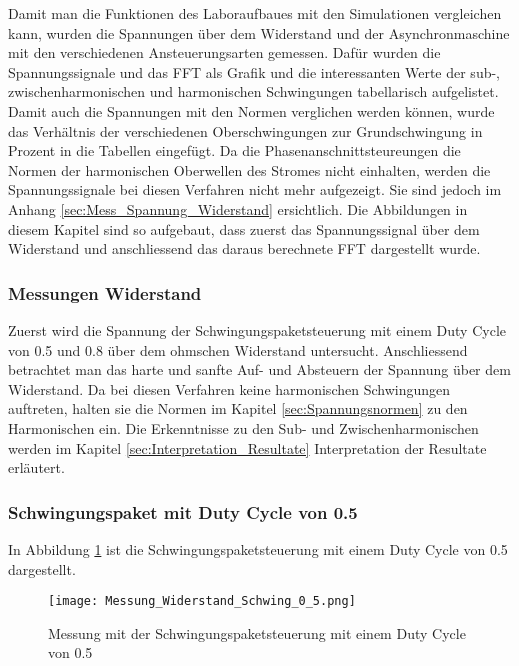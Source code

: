 Damit man die Funktionen des Laboraufbaues mit den Simulationen vergleichen kann, wurden die Spannungen über dem Widerstand und der Asynchronmaschine mit den verschiedenen Ansteuerungsarten gemessen. Dafür wurden die Spannungssignale und das FFT als Grafik und die interessanten Werte der sub-, zwischenharmonischen und harmonischen Schwingungen tabellarisch aufgelistet. Damit auch die Spannungen mit den Normen verglichen werden können, wurde das Verhältnis der verschiedenen Oberschwingungen zur Grundschwingung in Prozent in die Tabellen eingefügt. Da die Phasenanschnittsteureungen die Normen der harmonischen Oberwellen des Stromes nicht einhalten, werden die Spannungssignale bei diesen Verfahren nicht mehr aufgezeigt. Sie sind jedoch im Anhang \ref{sec:Mess_Spannung_Widerstand} ersichtlich. Die Abbildungen in diesem Kapitel sind so aufgebaut, dass zuerst das Spannungssignal über dem Widerstand und anschliessend das daraus berechnete FFT dargestellt wurde.

\subsubsection{Messungen Widerstand}

Zuerst wird die Spannung der Schwingungspaketsteuerung mit einem Duty Cycle von 0.5 und 0.8 über dem ohmschen Widerstand untersucht. Anschliessend betrachtet man das harte und sanfte Auf- und Absteuern der Spannung über dem Widerstand. Da bei diesen Verfahren keine harmonischen Schwingungen auftreten, halten sie die Normen im Kapitel \ref{sec:Spannungsnormen} zu den Harmonischen ein. Die Erkenntnisse zu den Sub- und Zwischenharmonischen werden im Kapitel \ref{sec:Interpretation_Resultate} Interpretation der Resultate erläutert.

\subsubsection*{Schwingungspaket mit Duty Cycle von 0.5}

In Abbildung \ref{fig:Mess_Schwing_50} ist die Schwingungspaketsteuerung mit einem Duty Cycle von 0.5 dargestellt.


\begin{figure}[ht!]
	\centering
	\texttt{[image: Messung\_Widerstand\_Schwing\_0\_5.png]}	
	\caption{Messung mit der Schwingungspaketsteuerung mit einem Duty Cycle von 0.5}\label{fig:Mess_Schwing_50}
\end{figure}


